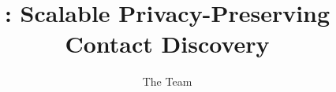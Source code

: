 \documentclass[manuscript,sigconf,nonacm,screen,review]{acmart}
\begin{document}
\title{\sysname: Scalable Privacy-Preserving Contact Discovery}

\ifdefined\publish
  \author{The Team}

  \renewcommand{\shortauthors}{Trovato and Tobin, et al.}
\else
  \author{}
\fi


\keywords{}

\maketitle











\ifdefined\publish
  
\fi




\appendix



\end{document}
